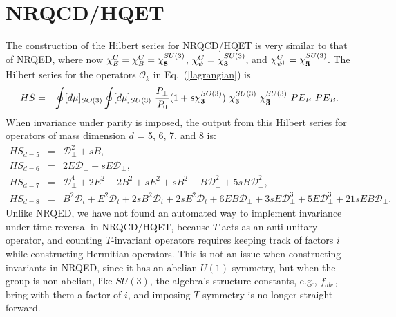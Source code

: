 \documentclass[prd,onecolumn, nofootinbib, 11pt]{revtex4}
\begin{document}
\section{NRQCD/HQET}
\label{secNRQCD}

The construction of the Hilbert series for NRQCD/HQET is very similar to that of NRQED, where now $\chi^C_E =\chi^C_B = \chi^{SU(3)}_{\bf 8}$,  $\chi^C_\psi = \chi^{SU(3)}_{\bf 3}$, and $\chi^C_{\psi^\dagger} = \chi^{SU(3)}_{\bf \bar{3}}$.  
The Hilbert series for the operators $\mathcal{O}_k$ in Eq.~(\ref{lagrangian}) is 
%
\begin{eqnarray}
HS &=&  \oint [d\mu]_{SO(3)} \oint [d\mu]_{SU(3)} ~  \frac{P_\perp}{P_0 } (1+s\chi_{\bf 3}^{SO(3)}) ~\chi_{\bf 3}^{SU(3)} ~\chi_{\bf \bar{3}}^{SU(3)} ~PE_E ~PE_B . 
\end{eqnarray}
%
When invariance under parity is imposed, the output from this Hilbert series for operators of mass dimension $d$ = 5, 6, 7, and 8 is:
%
\begin{eqnarray}
HS_{d=5} &=& \mathcal{D}_\perp^2 + sB , \\
HS_{d=6} &=& 2E\mathcal{D}_\perp + sE\mathcal{D}_\perp , \\
HS_{d=7} &=& \mathcal{D}_\perp^4 + 2E^2 + 2B^2 + sE^2 + sB^2 + B\mathcal{D}_\perp^2 + 5sB\mathcal{D}_\perp^2 , \\
HS_{d=8} &=& B^2 \mathcal{D}_t + E^2 \mathcal{D}_t + 2sB^2 \mathcal{D}_t + 2sE^2 \mathcal{D}_t + 6EB\mathcal{D}_\perp + 3sE\mathcal{D}^3_\perp + 5E\mathcal{D}^3_\perp + 21 s EB\mathcal{D}_\perp .
\end{eqnarray}
%
Unlike NRQED, we have not found an automated way to implement invariance under time reversal in NRQCD/HQET,
 because $T$ acts as an anti-unitary operator, and counting $T$-invariant operators requires keeping track of factors $i$ while constructing Hermitian operators.  This is not an issue when constructing invariants in NRQED, since it has an abelian $U(1)$ symmetry, but when the group is non-abelian, like $SU(3)$, the algebra's structure constants, e.g., $f_{abc}$, bring with them a factor of $i$, and imposing $T$-symmetry is no longer straight-forward.    
\end{document}

